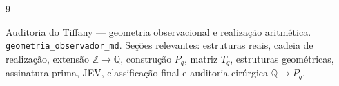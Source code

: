 \documentclass[11pt,a4paper]{article}
\begin{document}
\begin{thebibliography}{9}

Auditoria do Tiffany --- geometria observacional e realização aritmética.
\texttt{geometria\_observador\_md}.
Seções relevantes: estruturas reais, cadeia de realização,
extensão \(\mathbb{Z}\!\to\!\mathbb{Q}\), construção \(P_q\),
matriz \(T_q\), estruturas geométricas, assinatura prima, JEV,
classificação final e auditoria cirúrgica \(\mathbb{Q}\!\to\!P_q\).

\end{thebibliography}
\end{document}
